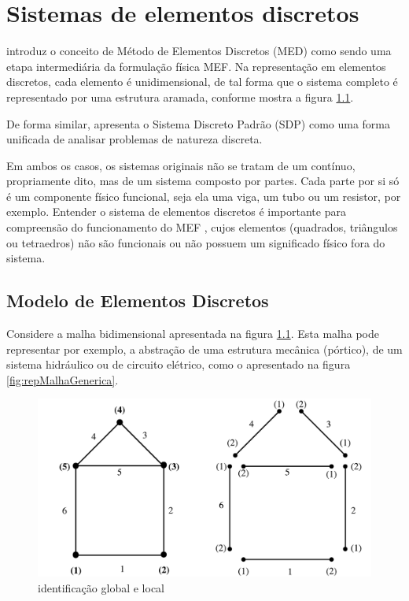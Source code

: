 \documentclass[
    12pt,               %
    openright,          %
    oneside,
    a4paper,            %
    english,            %
    french,             %
    spanish,            %
    brazil              %
    ]{abntex2}
\begin{document}
\begin{apendicesenv}
\label{chap:apendices}

\partapendices

\chapter{Sistemas de elementos discretos}




\label{sec:SED}

\cite[p. 68]{desai} introduz o conceito de Método de Elementos Discretos (MED) como sendo uma etapa intermediária da formulação física MEF. Na representação em elementos discretos, cada elemento é unidimensional, de tal forma que o sistema completo é representado por uma estrutura aramada, conforme mostra a figura \ref{fig:malhaGenerica}.

De forma similar, \cite[p. 2]{zien} apresenta o Sistema Discreto Padrão (SDP) como uma forma unificada de analisar problemas de natureza discreta.

Em ambos os casos, os sistemas originais não se tratam de um contínuo, propriamente dito, mas de um sistema composto por partes. Cada parte por si só é um componente físico funcional, seja ela uma viga, um tubo ou um resistor, por exemplo. Entender o sistema de elementos discretos é importante para compreensão do funcionamento do MEF \cite[p. 6]{zien}, cujos elementos (quadrados, triângulos ou tetraedros) não são funcionais ou não possuem um significado físico fora do sistema.


\section{Modelo de Elementos Discretos}

Considere a malha bidimensional  apresentada na figura \ref{fig:malhaGenerica}. Esta malha pode representar por exemplo, a abstração de uma estrutura mecânica (pórtico), de um sistema hidráulico ou de circuito elétrico, como o apresentado na figura \ref{fig:repMalhaGenerica}.
\begin{figure}[!htb]
	\centering
	\includegraphics[scale=0.7]{figuras/malhaGen.pdf}	
	\caption{identificação global e local}
	\label{fig:malhaGenerica}
\end{figure}


\end{apendicesenv}
\end{document}
